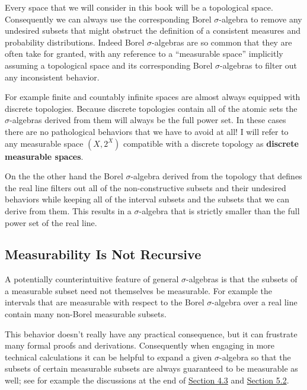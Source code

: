 \documentclass[
  letterpaper,
  DIV=11,
  numbers=noendperiod]{scrartcl}
\begin{document}
Every space that we will consider in this book will be a topological
space. Consequently we can always use the corresponding Borel
\(\sigma\)-algebra to remove any undesired subsets that might obstruct
the definition of a consistent measures and probability distributions.
Indeed Borel \(\sigma\)-algebras are so common that they are often take
for granted, with any reference to a ``measurable space'' implicitly
assuming a topological space and its corresponding Borel
\(\sigma\)-algebras to filter out any inconsistent behavior.

For example finite and countably infinite spaces are almost always
equipped with discrete topologies. Because discrete topologies contain
all of the atomic sets the \(\sigma\)-algebras derived from them will
always be the full power set. In these cases there are no pathological
behaviors that we have to avoid at all! I will refer to any measurable
space \((X, 2^{X})\) compatible with a discrete topology as
\textbf{discrete measurable spaces}.

On the the other hand the Borel \(\sigma\)-algebra derived from the
topology that defines the real line filters out all of the
non-constructive subsets and their undesired behaviors while keeping all
of the interval subsets and the subsets that we can derive from them.
This results in a \(\sigma\)-algebra that is strictly smaller than the
full power set of the real line.

\hypertarget{measurability-is-not-recursive}{%
\subsection{Measurability Is Not
Recursive}\label{measurability-is-not-recursive}}

A potentially counterintuitive feature of general \(\sigma\)-algebras is
that the subsets of a measurable subset need not themselves be
measurable. For example the intervals that are measurable with respect
to the Borel \(\sigma\)-algebra over a real line contain many non-Borel
measurable subsets.

This behavior doesn't really have any practical consequence, but it can
frustrate many formal proofs and derivations. Consequently when engaging
in more technical calculations it can be helpful to expand a given
\(\sigma\)-algebra so that the subsets of certain measurable subsets are
always guaranteed to be measurable as well; see for example the
discussions at the end of \href{@sec:null}{Section 4.3} and
\href{@sec:lebesgue}{Section 5.2}.
\end{document}
